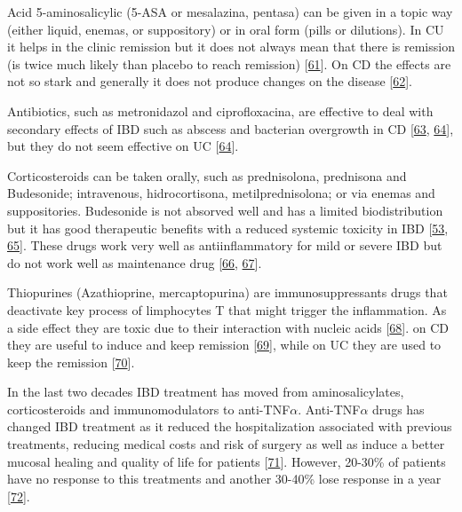 \documentclass[
  a4paper,
]{book}
\begin{document}
Acid 5-aminosalicylic (5-ASA or mesalazina, pentasa) can be given in a topic way (either liquid, enemas, or suppository) or in oral form (pills or dilutions).
In CU it helps in the clinic remission but it does not always mean that there is remission (is twice much likely than placebo to reach remission) {[}\protect\hyperlink{ref-travis2006}{61}{]}.
On CD the effects are not so stark and generally it does not produce changes on the disease {[}\protect\hyperlink{ref-akobeng2016}{62}{]}.

Antibiotics, such as metronidazol and ciprofloxacina, are effective to deal with secondary effects of IBD such as abscess and bacterian overgrowth in CD {[}\protect\hyperlink{ref-feller2010}{63}, \protect\hyperlink{ref-prantera2009}{64}{]}, but they do not seem effective on UC {[}\protect\hyperlink{ref-prantera2009}{64}{]}.

Corticosteroids can be taken orally, such as prednisolona, prednisona and Budesonide; intravenous, hidrocortisona, metilprednisolona; or via enemas and suppositories.
Budesonide is not absorved well and has a limited biodistribution but it has good therapeutic benefits with a reduced systemic toxicity in IBD {[}\protect\hyperlink{ref-peyrin-biroulet2010}{53}, \protect\hyperlink{ref-rezaie2015}{65}{]}.
These drugs work very well as antiinflammatory for mild or severe IBD but do not work well as maintenance drug {[}\protect\hyperlink{ref-lichtenstein2009}{66}, \protect\hyperlink{ref-ouellette2001}{67}{]}.

Thiopurines (Azathioprine, mercaptopurina) are immunosuppressants drugs that deactivate key process of limphocytes T that might trigger the inflammation.
As a side effect they are toxic due to their interaction with nucleic acids {[}\protect\hyperlink{ref-warner2018}{68}{]}.
on CD they are useful to induce and keep remission {[}\protect\hyperlink{ref-chande2015}{69}{]}, while on UC they are used to keep the remission {[}\protect\hyperlink{ref-gisbert2009}{70}{]}.

In the last two decades IBD treatment has moved from aminosalicylates, corticosteroids and immunomodulators to anti-TNF\(\alpha\).
Anti-TNF\(\alpha\) drugs has changed IBD treatment as it reduced the hospitalization associated with previous treatments, reducing medical costs and risk of surgery as well as induce a better mucosal healing and quality of life for patients {[}\protect\hyperlink{ref-peyrin-biroulet2011}{71}{]}.
However, 20-30\% of patients have no response to this treatments and another 30-40\% lose response in a year {[}\protect\hyperlink{ref-billioud2011}{72}{]}.
\end{document}
